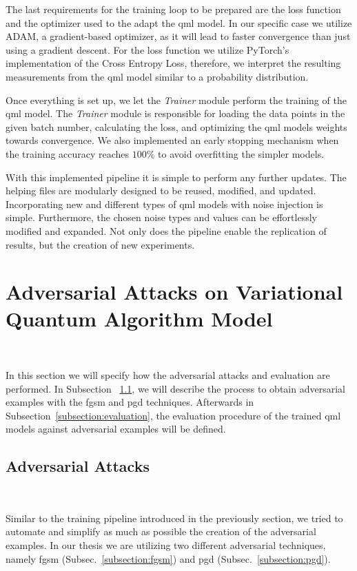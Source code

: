 The last requirements for the training loop to be prepared are the
loss function and the optimizer used to the adapt the \ac{qml} model. In our
specific case we utilize ADAM, a gradient-based optimizer, as it will
lead to faster convergence than just using a gradient descent. For the
loss function we utilize PyTorch's implementation of the Cross Entropy
Loss, therefore, we interpret the resulting measurements from the
\ac{qml} model similar to a probability distribution.  \

Once everything is set up, we let the \textit{Trainer} module
perform the training of the \ac{qml} model. The \textit{Trainer}
module is responsible for loading the data points in the given
batch number, calculating the loss, and optimizing the \ac{qml}
models weights towards convergence. We also implemented an early
stopping mechanism when the training accuracy reaches \(100\%\)
to avoid overfitting the simpler models. \

With this implemented pipeline it is simple to perform
any further updates. The helping files are modularly
designed to be reused, modified, and updated. Incorporating
new and different types of \ac{qml} models with noise
injection is simple. Furthermore, the chosen noise types
and values can be effortlessly modified and expanded. 
Not only does the pipeline enable the replication of results,
but the creation of new experiments. \

\section{Adversarial Attacks on Variational Quantum Algorithm Model}\label{section:vqa_attacks} \

In this section we will specify how the adversarial
attacks and evaluation are performed. In Subsection
~\ref{subsection:adv_attacks}, we will describe the process
to obtain adversarial examples with the \ac{fgsm} and \ac{pgd}
techniques. Afterwards in Subsection~\ref{subsection:evaluation},
the evaluation procedure of the trained \ac{qml} models against
adversarial examples will be defined. \

\subsection{Adversarial Attacks}\label{subsection:adv_attacks}\

Similar to the training pipeline introduced in the previously
section, we tried to automate and simplify as much as possible
the creation of the adversarial examples. In our thesis we
are utilizing two different adversarial techniques, namely
\ac{fgsm} (Subsec.~\ref{subsection:fgsm}) and \ac{pgd}
(Subsec.~\ref{subsection:pgd}). \


